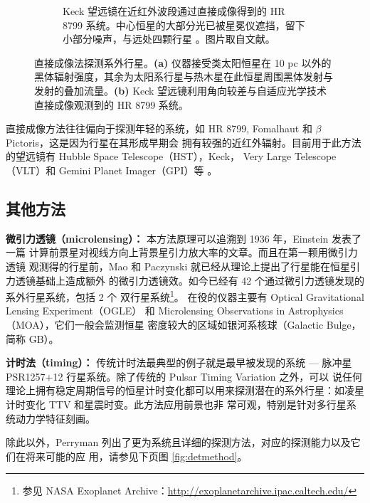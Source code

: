 \begin{figure}[h]
\begin{subfigure}[b]{.48\textwidth}
\caption[Keck 望远镜利用角向较差成像与自适应光学技术在近红外波段通过直接成像得到的 HR 8799 系统。中心恒星的大部分光已被星冕仪遮挡，留下小部分噪声，与远处四颗行星 。图片版权：Marois 等人。]{Keck 望远镜在近红外波段通过直接成像得到的 HR 8799 系统。中心恒星的大部分光已被星冕仪遮挡，留下小部分噪声，与远处四颗行星 。图片取自文献。}
\label{fig:hr8799}
\end{subfigure}
\caption{直接成像法探测系外行星。\textbf{(a)} 仪器接受类太阳恒星在 10 pc 以外的黑体辐射强度，其余为太阳系行星与热木星在此恒星周围黑体发射与发射的叠加流量。\textbf{(b)} Keck 望远镜利用角向较差与自适应光学技术直接成像观测到的 HR 8799 系统。}
\label{fig:directimage} 
\end{figure}

直接成像方法往往偏向于探测年轻的系统，如 HR 8799\cite{Marois2008HR8799}, 
Fomalhaut\cite{Kalas2008} 和 $\beta$ Pictoris\cite{Lagrange2010}，这是因为行星在其形成早期会
拥有较强的近红外辐射。目前用于此方法的望远镜有 Hubble Space Telescope（HST），Keck，
Very Large Telescope（VLT）和 Gemini Planet Imager（GPI）等
\cite{Marois2008HR8799,Chauvin2005,Macintosh2014}。

\subsection{其他方法}
\textbf{微引力透镜（microlensing）：} 本方法原理可以追溯到 1936 年，Einstein 发表了一篇
计算前景星对视线方向上背景星引力放大率的文章\cite{Einstein1936}。而且在第一颗用微引力透镜
观测得的行星前，Mao 和  Paczynski 就已经从理论上提出了行星能在恒星引力透镜基础上造成额外
的微引力透镜效\cite{Mao1991}。如今已经有 42 个通过微引力透镜发现的系外行星系统，包括 2 个
双行星系统\footnote{参见 NASA Exoplanet Archive：\url{http://exoplanetarchive.ipac.caltech.edu/}}。
在役的仪器主要有 Optical Gravitational Lensing Experiment（OGLE）\cite{Udalskietal2002OGLE} 
和 Microlensing Observations in Astrophysics（MOA）\cite{Bond2004MOA}，它们一般会监测恒星
密度较大的区域如银河系核球（Galactic Bulge，简称 GB）。

\textbf{计时法（timing）：} 传统计时法最典型的例子就是最早被发现的系统 --- 脉冲星 
PSR1257+12 行星系统\cite{WolszczanFrail1992}。除了传统的 Pulsar Timing Variation 之外，可以
说任何理论上拥有稳定周期信号的恒星计时变化都可以用来探测潜在的系外行星：如凌星计时变化 
TTV\cite{Ford2011TTV,Xie2013} 和星震时变\cite{Silvotti2007,Murphy2016}。此方法应用前景也非
常可观，特别是针对多行星系统动力学特征刻画\cite{HolmanMurray2005}。

除此以外，Perryman 列出了更为系统且详细的探测方法，对应的探测能力以及它们在将来可能的应
用\cite{Perryman2000}，请参见下页图 \ref{fig:detmethod}。

